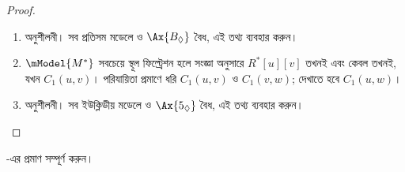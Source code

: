 \documentclass[../../../include/open-logic-section]{subfiles}
\begin{document}
\begin{proof}
\begin{enumerate}
  \item অনুশীলনী। সব প্রতিসম মডেলে  ও $\Ax{B_\Diamond}$ বৈধ, এই তথ্য ব্যবহার করুন।
  \item $\mModel{M^*}$ সবচেয়ে স্থূল ফিল্ট্রেশন হলে সংজ্ঞা অনুসারে $R^*[u][v]$ তখনই এবং কেবল তখনই, যখন $C_1(u,v)$। পরিযায়িতা প্রমাণে ধরি $C_1(u,v)$ ও $C_1(v,w)$; দেখাতে হবে $C_1(u,w)$। 
  \item অনুশীলনী। সব ইউক্লিডীয় মডেলে  ও $\Ax{5_\Diamond}$ বৈধ, এই তথ্য ব্যবহার করুন।
\end{enumerate}
\end{proof}

\begin{prob}
  -এর প্রমাণ সম্পূর্ণ করুন।
\end{prob}
\end{document}
